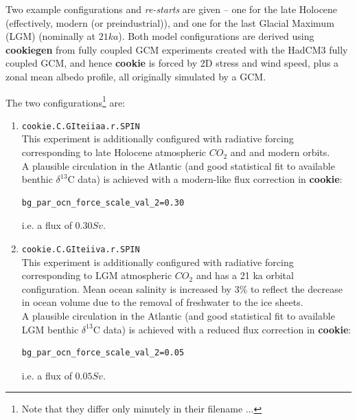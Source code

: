 Two example configurations and \textit{re-starts} are given -- one for the late Holocene (effectively, modern (or preindustrial)), and one for the last Glacial Maximum (LGM) (nominally at \(21ka\)). Both model configurations are derived using \textbf{cookiegen} from fully coupled GCM experiments created with the HadCM3 fully coupled GCM, and hence \textbf{cookie} is forced by 2D stress and wind speed, plus a zonal mean albedo profile, all originally simulated by a GCM.

\vspace{1mm}
The two configurations\footnote{Note that they differ only minutely in their filename ...} are:

\begin{enumerate}[noitemsep]
\vspace{1mm}
\item \texttt{cookie.C.GIteiiaa.r.SPIN}
\vspace{1mm}
\\This experiment is additionally configured with radiative forcing corresponding to late Holocene atmospheric \(CO_{2}\) and and modern orbits.
\\A plausible circulation in the Atlantic (and good statistical fit to available benthic $\delta^{13}$C data) is achieved with a modern-like flux correction in \textbf{cookie}:
\vspace{-2mm}\begin{verbatim}
bg_par_ocn_force_scale_val_2=0.30
\end{verbatim}\vspace{-2mm}
i.e. a flux of \(0.30 Sv\).
\vspace{1mm}
\item \texttt{cookie.C.GIteiiva.r.SPIN}
\vspace{1mm}
\\This experiment is additionally configured with radiative forcing corresponding to LGM atmospheric \(CO_{2}\) and has a 21 ka orbital configuration. Mean ocean salinity is increased by 3\% to reflect the decrease in ocean volume due to the removal of freshwater to the ice sheets.
\\A plausible circulation in the Atlantic (and good statistical fit to available LGM benthic $\delta^{13}$C data) is achieved with a reduced flux correction in \textbf{cookie}:
\vspace{-2mm}\begin{verbatim}
bg_par_ocn_force_scale_val_2=0.05
\end{verbatim}\vspace{-2mm}
i.e. a flux of \(0.05 Sv\).
\end{enumerate}
\vspace{1mm}

